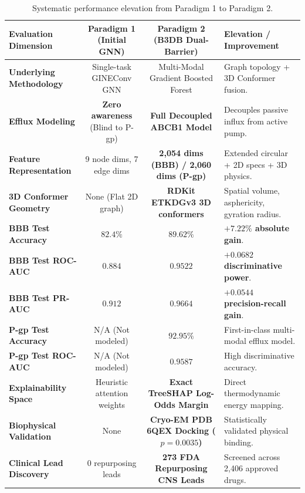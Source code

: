 \documentclass[11pt,a4paper]{article}
\begin{document}
\begin{table}[h!]
\centering
\small
\begin{tabularx}{\textwidth}{l c c X}
\toprule
\textbf{Evaluation Dimension} & \textbf{Paradigm 1 (Initial GNN)} & \textbf{Paradigm 2 (B3DB Dual-Barrier)} & \textbf{Elevation / Improvement} \\
\midrule
\textbf{Underlying Methodology} & Single-task GINEConv GNN & Multi-Modal Gradient Boosted Forest & Graph topology + 3D Conformer fusion. \\
\textbf{Efflux Modeling} & \textbf{Zero awareness} (Blind to P-gp) & \textbf{Full Decoupled ABCB1 Model} & Decouples passive influx from active pump. \\
\textbf{Feature Representation} & 9 node dims, 7 edge dims & \textbf{2,054 dims (BBB) / 2,060 dims (P-gp)} & Extended circular + 2D specs + 3D physics. \\
\textbf{3D Conformer Geometry} & None (Flat 2D graph) & \textbf{RDKit ETKDGv3 3D conformers} & Spatial volume, asphericity, gyration radius. \\
\textbf{BBB Test Accuracy} & $82.4\%$ & \textbf{$89.62\%$} & \textbf{$+7.22\%$ absolute gain}. \\
\textbf{BBB Test ROC-AUC} & $0.884$ & \textbf{$0.9522$} & \textbf{$+0.0682$ discriminative power}. \\
\textbf{BBB Test PR-AUC} & $0.912$ & \textbf{$0.9664$} & \textbf{$+0.0544$ precision-recall gain}. \\
\textbf{P-gp Test Accuracy} & N/A (Not modeled) & \textbf{$92.95\%$} & First-in-class multi-modal efflux model. \\
\textbf{P-gp Test ROC-AUC} & N/A (Not modeled) & \textbf{$0.9587$} & High discriminative accuracy. \\
\textbf{Explainability Space} & Heuristic attention weights & \textbf{Exact TreeSHAP Log-Odds Margin} & Direct thermodynamic energy mapping. \\
\textbf{Biophysical Validation} & None & \textbf{Cryo-EM PDB 6QEX Docking ($p=0.0035$)} & Statistically validated physical binding. \\
\textbf{Clinical Lead Discovery} & 0 repurposing leads & \textbf{273 FDA Repurposing CNS Leads} & Screened across 2,406 approved drugs. \\
\bottomrule
\end{tabularx}
\caption{Systematic performance elevation from Paradigm 1 to Paradigm 2.}
\end{table}
\end{document}
